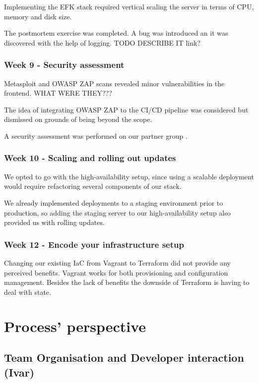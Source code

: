 \documentclass{article}
\begin{document}
Implementing the EFK stack required vertical scaling the server in terms of CPU, memory and disk size.

The postmortem exercise was completed. A bug was introduced an it was discovered with the help of logging. TODO DESCRIBE IT link?

\subsubsection{Week 9 - Security  assessment}

Metasploit and OWASP ZAP scans revealed minor vulnerabilities in the frontend. WHAT WERE THEY???

The idea of integrating OWASP ZAP to the CI/CD pipeline was considered but dismissed on grounds of being beyond the scope.

A security assessment was performed on our partner group \label{appendix:security assessment}. 


\subsubsection{Week 10 - Scaling and rolling out updates }

We opted to go with the high-availability setup, since using a scalable deployment would require refactoring several components of our stack.

We already implemented deployments to a staging environment prior to production, so adding the staging server to our high-availability setup also provided us with rolling updates.  

\subsubsection{Week 12 - Encode your infrastructure setup }

Changing our existing IaC from Vagrant to Terraform did not provide any perceived benefits. Vagrant works for both provisioning and configuration management. Besides the lack of benefits the downside of Terraform is having to deal with state. 

\section{Process' perspective} \label{cicd}

\subsection{Team Organisation and Developer interaction (Ivar)} 
\end{document}
